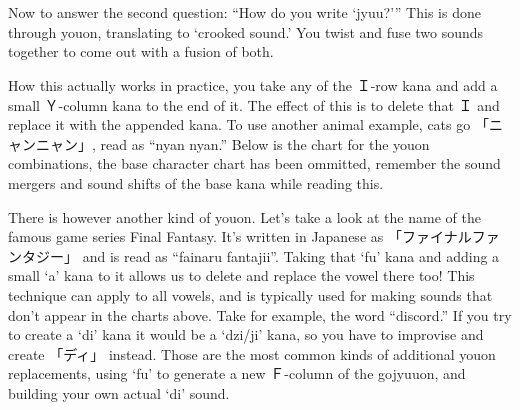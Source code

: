 \section[拗音]{}\label{sec:PR;仮名;拗音}

Now to answer the second question: ``How do you write `jyuu?''' This is done through youon, translating to `crooked sound.' You twist and fuse two sounds together to come out with a fusion of both.

How this actually works in practice, you take any of the Ｉ-row kana and add a small Ｙ-column kana to the end of it. The effect of this is to delete that Ｉ and replace it with the appended kana. To use another animal example, cats go 「ニャンニャン」, read as ``nyan nyan.'' Below is the chart for the youon combinations, the base character chart has been ommitted, remember the sound mergers and sound shifts of the base kana while reading this.





There is however another kind of youon. Let's take a look at the name of the famous game series Final Fantasy. It's written in Japanese as 「ファイナルファンタジー」 and is read as ``fainaru fantajii''. Taking that `fu' kana and adding a small `a' kana to it allows us to delete and replace the vowel there too! This technique can apply to all vowels, and is typically used for making sounds that don't appear in the charts above. Take for example, the word ``discord.'' If you try to create a `di' kana it would be a `dzi/ji' kana, so you have to improvise and create 「ディ」 instead. Those are the most common kinds of additional youon replacements, using `fu' to generate a new Ｆ-column of the gojyuuon, and building your own actual `di' sound.